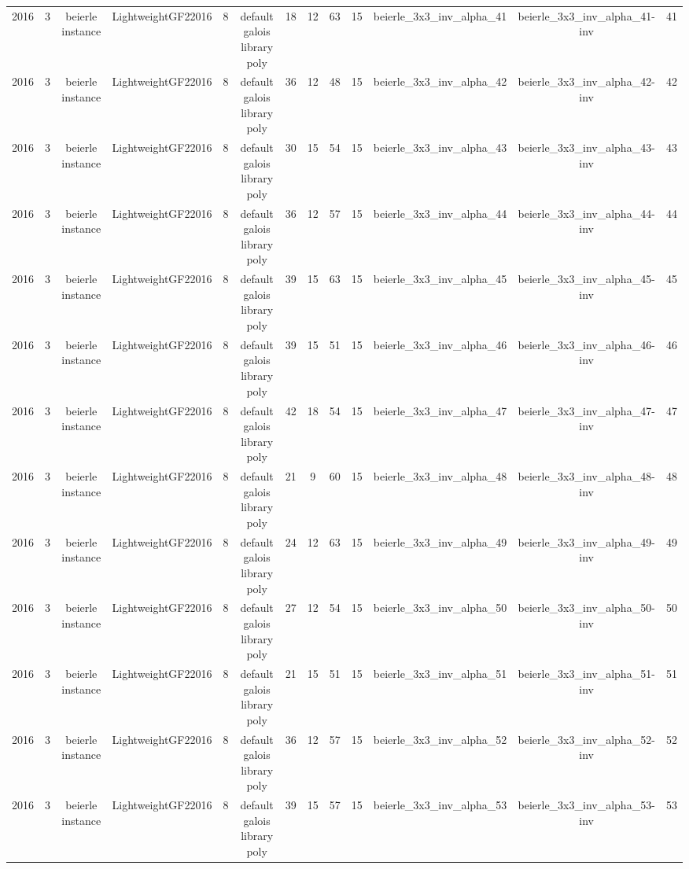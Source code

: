 \begin{tabular}{c c c c c c c c c c c c c}
2016 & 3 & beierle instance & LightweightGF22016 & 8 & default galois library poly & 18 & 12 & 63 & 15 & beierle_3x3_inv_alpha_41 & beierle_3x3_inv_alpha_41-inv & 41 \\
2016 & 3 & beierle instance & LightweightGF22016 & 8 & default galois library poly & 36 & 12 & 48 & 15 & beierle_3x3_inv_alpha_42 & beierle_3x3_inv_alpha_42-inv & 42 \\
2016 & 3 & beierle instance & LightweightGF22016 & 8 & default galois library poly & 30 & 15 & 54 & 15 & beierle_3x3_inv_alpha_43 & beierle_3x3_inv_alpha_43-inv & 43 \\
2016 & 3 & beierle instance & LightweightGF22016 & 8 & default galois library poly & 36 & 12 & 57 & 15 & beierle_3x3_inv_alpha_44 & beierle_3x3_inv_alpha_44-inv & 44 \\
2016 & 3 & beierle instance & LightweightGF22016 & 8 & default galois library poly & 39 & 15 & 63 & 15 & beierle_3x3_inv_alpha_45 & beierle_3x3_inv_alpha_45-inv & 45 \\
2016 & 3 & beierle instance & LightweightGF22016 & 8 & default galois library poly & 39 & 15 & 51 & 15 & beierle_3x3_inv_alpha_46 & beierle_3x3_inv_alpha_46-inv & 46 \\
2016 & 3 & beierle instance & LightweightGF22016 & 8 & default galois library poly & 42 & 18 & 54 & 15 & beierle_3x3_inv_alpha_47 & beierle_3x3_inv_alpha_47-inv & 47 \\
2016 & 3 & beierle instance & LightweightGF22016 & 8 & default galois library poly & 21 & 9 & 60 & 15 & beierle_3x3_inv_alpha_48 & beierle_3x3_inv_alpha_48-inv & 48 \\
2016 & 3 & beierle instance & LightweightGF22016 & 8 & default galois library poly & 24 & 12 & 63 & 15 & beierle_3x3_inv_alpha_49 & beierle_3x3_inv_alpha_49-inv & 49 \\
2016 & 3 & beierle instance & LightweightGF22016 & 8 & default galois library poly & 27 & 12 & 54 & 15 & beierle_3x3_inv_alpha_50 & beierle_3x3_inv_alpha_50-inv & 50 \\
2016 & 3 & beierle instance & LightweightGF22016 & 8 & default galois library poly & 21 & 15 & 51 & 15 & beierle_3x3_inv_alpha_51 & beierle_3x3_inv_alpha_51-inv & 51 \\
2016 & 3 & beierle instance & LightweightGF22016 & 8 & default galois library poly & 36 & 12 & 57 & 15 & beierle_3x3_inv_alpha_52 & beierle_3x3_inv_alpha_52-inv & 52 \\
2016 & 3 & beierle instance & LightweightGF22016 & 8 & default galois library poly & 39 & 15 & 57 & 15 & beierle_3x3_inv_alpha_53 & beierle_3x3_inv_alpha_53-inv & 53 \\

\end{tabular}
